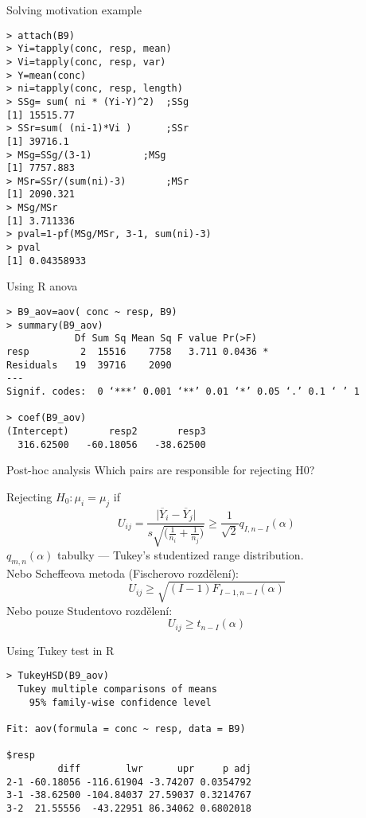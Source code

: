 \documentclass[smaller]{beamer}
\def\abs#1{\lvert#1\rvert}
\def\ol#1{\overline{#1}}
\def\xskip{{\vspace{2ex}}}
\begin{document}
\begin{frame}[fragile]{Solving motivation example}
\begin{verbatim}
> attach(B9)
> Yi=tapply(conc, resp, mean)
> Vi=tapply(conc, resp, var)
> Y=mean(conc)
> ni=tapply(conc, resp, length)
> SSg= sum( ni * (Yi-Y)^2)	;SSg
[1] 15515.77
> SSr=sum( (ni-1)*Vi )		;SSr
[1] 39716.1
> MSg=SSg/(3-1)			;MSg
[1] 7757.883
> MSr=SSr/(sum(ni)-3)		;MSr
[1] 2090.321
> MSg/MSr
[1] 3.711336
> pval=1-pf(MSg/MSr, 3-1, sum(ni)-3)
> pval
[1] 0.04358933 
\end{verbatim}
\end{frame}

\begin{frame}[fragile]{Using R anova}
\begin{verbatim}
> B9_aov=aov( conc ~ resp, B9)
> summary(B9_aov)
            Df Sum Sq Mean Sq F value Pr(>F)  
resp         2  15516    7758   3.711 0.0436 *
Residuals   19  39716    2090                 
---
Signif. codes:  0 ‘***’ 0.001 ‘**’ 0.01 ‘*’ 0.05 ‘.’ 0.1 ‘ ’ 1 

> coef(B9_aov)
(Intercept)       resp2       resp3 
  316.62500   -60.18056   -38.62500 
\end{verbatim}
\end{frame}

\begin{frame}{Post-hoc analysis}
Which pairs are responsible for rejecting H0?

\xskip
 Rejecting $H_0: \mu_i = \mu_j$ if
 \[
   U_{ij} = \frac{ \abs{\ol{Y}_i - \ol{Y}_j} }{ s \sqrt{\big(\frac{1}{n_i} + \frac{1}{n_j} \big)} } 
   \ge \frac{1}{\sqrt{2}} q_{I,n-I}(\alpha)
 \]
 $q_{m,n}(\alpha)$ tabulky --- Tukey's studentized range distribution.\\
 Nebo Scheffeova metoda (Fischerovo rozdělení):
 \[
    U_{ij} \ge \sqrt{(I-1)F_{I-1,n-I}(\alpha)}
 \]
 Nebo pouze Studentovo rozdělení:
 \[
     U_{ij} \ge t_{n-I}(\alpha)
 \] 
\end{frame}

\begin{frame}{Using Tukey test in R}
\begin{verbatim}
> TukeyHSD(B9_aov)
  Tukey multiple comparisons of means
    95% family-wise confidence level

Fit: aov(formula = conc ~ resp, data = B9)

$resp
         diff        lwr      upr     p adj
2-1 -60.18056 -116.61904 -3.74207 0.0354792
3-1 -38.62500 -104.84037 27.59037 0.3214767
3-2  21.55556  -43.22951 86.34062 0.6802018
\end{verbatim}
 
\end{frame}
\end{document}
